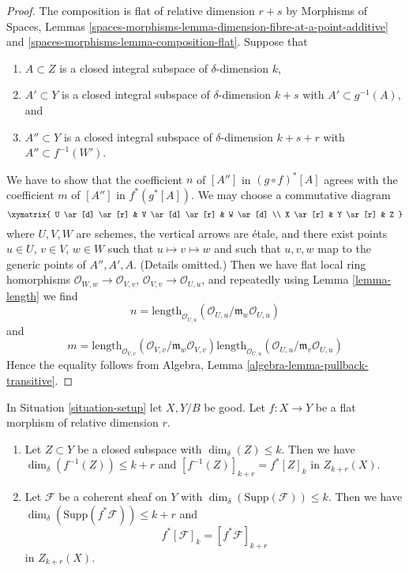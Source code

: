 \begin{proof}
The composition is flat of relative dimension $r + s$ by
Morphisms of Spaces, Lemmas
\ref{spaces-morphisms-lemma-dimension-fibre-at-a-point-additive} and
\ref{spaces-morphisms-lemma-composition-flat}.
Suppose that
\begin{enumerate}
\item $A \subset Z$ is a closed integral subspace of $\delta$-dimension $k$,
\item $A' \subset Y$ is a closed integral subspace of $\delta$-dimension
$k + s$ with $A' \subset g^{-1}(A)$, and
\item $A'' \subset Y$ is a closed integral subspace of $\delta$-dimension
$k + s + r$ with $A'' \subset f^{-1}(W')$.
\end{enumerate}
We have to show that the coefficient $n$ of $[A'']$ in $(g \circ f)^*[A]$
agrees with the coefficient $m$ of $[A'']$ in $f^*(g^*[A])$. We may choose
a commutative diagram
$$
\xymatrix{
U \ar[d] \ar[r] & V \ar[d] \ar[r] & W \ar[d] \\
X \ar[r] & Y \ar[r] & Z
}
$$
where $U, V, W$ are schemes, the vertical arrows are \'etale, and
there exist points $u \in U$, $v \in V$, $w \in W$ such that
$u \mapsto v \mapsto w$ and such that $u, v, w$ map to the generic
points of $A'', A', A$. (Details omitted.)
Then we have flat local ring homorphisms
$\mathcal{O}_{W, w} \to \mathcal{O}_{V, v}$,
$\mathcal{O}_{V, v} \to \mathcal{O}_{U, u}$,
and repeatedly using Lemma \ref{lemma-length}
we find
$$
n = \text{length}_{\mathcal{O}_{U, u}}(
\mathcal{O}_{U, u}/\mathfrak m_w\mathcal{O}_{U, u})
$$
and
$$
m =
\text{length}_{\mathcal{O}_{V, v}}(
\mathcal{O}_{V, v}/\mathfrak m_w\mathcal{O}_{V, v})
\text{length}_{\mathcal{O}_{U, u}}(
\mathcal{O}_{U, u}/\mathfrak m_v\mathcal{O}_{U, u})
$$
Hence the equality follows from
Algebra, Lemma \ref{algebra-lemma-pullback-transitive}.
\end{proof}

\begin{lemma}
\label{lemma-pullback-coherent}
In Situation \ref{situation-setup} let $X, Y/B$ be good.
Let $f : X \to Y$ be a flat morphism of relative dimension $r$.
\begin{enumerate}
\item Let $Z \subset Y$ be a closed subspace with
$\dim_\delta(Z) \leq k$. Then we have
$\dim_\delta(f^{-1}(Z)) \leq k + r$
and $[f^{-1}(Z)]_{k + r} = f^*[Z]_k$ in $Z_{k + r}(X)$.
\item Let $\mathcal{F}$ be a coherent sheaf on $Y$ with
$\dim_\delta(\text{Supp}(\mathcal{F})) \leq k$.
Then we have $\dim_\delta(\text{Supp}(f^*\mathcal{F})) \leq k + r$
and
$$
f^*[{\mathcal F}]_k = [f^*{\mathcal F}]_{k+r}
$$
in $Z_{k + r}(X)$.
\end{enumerate}
\end{lemma}


